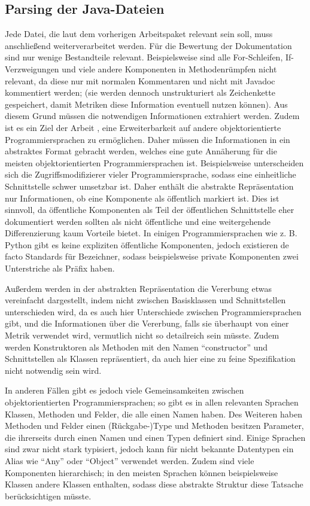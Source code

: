 \subsection{Parsing der Java-Dateien} 
Jede Datei, die laut dem vorherigen Arbeitspaket relevant sein soll, muss anschließend weiterverarbeitet werden. Für die Bewertung der Dokumentation sind nur wenige Bestandteile relevant. Beispielsweise sind alle For-Schleifen, If-Verzweigungen und viele andere Komponenten in Methodenrümpfen nicht relevant, da diese nur mit normalen Kommentaren und nicht mit Javadoc kommentiert werden; (sie werden dennoch unstrukturiert als Zeichenkette gespeichert, damit Metriken diese Information eventuell nutzen können). Aus diesem Grund müssen die notwendigen Informationen extrahiert werden. Zudem ist es ein Ziel der Arbeit , eine Erweiterbarkeit auf andere objektorientierte Programmiersprachen zu ermöglichen. Daher müssen die Informationen in ein abstraktes Format gebracht werden, welches eine gute Annäherung für die meisten objektorientierten Programmiersprachen ist. Beispielsweise unterscheiden sich die Zugriffsmodifizierer vieler Programmiersprache, sodass eine einheitliche Schnittstelle schwer umsetzbar ist. Daher enthält die abstrakte Repräsentation nur Informationen, ob eine Komponente als öffentlich markiert ist. Dies ist sinnvoll, da öffentliche Komponenten als Teil der öffentlichen Schnittstelle eher dokumentiert werden sollten als nicht öffentliche und eine weitergehende Differenzierung kaum Vorteile bietet. In einigen Programmiersprachen wie z. B. Python gibt es keine expliziten öffentliche Komponenten, jedoch existieren de facto Standards für Bezeichner, sodass beispielsweise private Komponenten zwei Unterstriche als Präfix haben.

Außerdem werden in der abstrakten Repräsentation die Vererbung etwas vereinfacht dargestellt, indem nicht zwischen Basisklassen und Schnittstellen unterschieden wird, da es auch hier Unterschiede zwischen Programmiersprachen gibt, und die Informationen über die Vererbung, falls sie überhaupt von einer Metrik verwendet wird, vermutlich nicht so detailreich sein müsste. Zudem werden Konstruktoren als Methoden mit den Namen \enquote{constructor} und Schnittstellen als Klassen repräsentiert, da auch hier eine zu feine Spezifikation nicht notwendig sein wird.  

  

In anderen Fällen gibt es jedoch viele Gemeinsamkeiten zwischen objektorientierten Programmiersprachen; so gibt es in  allen relevanten Sprachen Klassen, Methoden und Felder, die alle einen Namen haben. Des Weiteren haben Methoden und Felder einen (Rückgabe-)Type und Methoden besitzen Parameter, die ihrerseits durch einen Namen und einen Typen definiert sind. Einige Sprachen sind zwar nicht stark typisiert, jedoch kann für nicht bekannte Datentypen ein Alias wie \enquote{Any} oder  \enquote{Object} verwendet werden.  Zudem sind viele Komponenten hierarchisch; in den meisten Sprachen können beispielsweise Klassen andere Klassen enthalten, sodass diese abstrakte Struktur diese Tatsache berücksichtigen müsste. 

